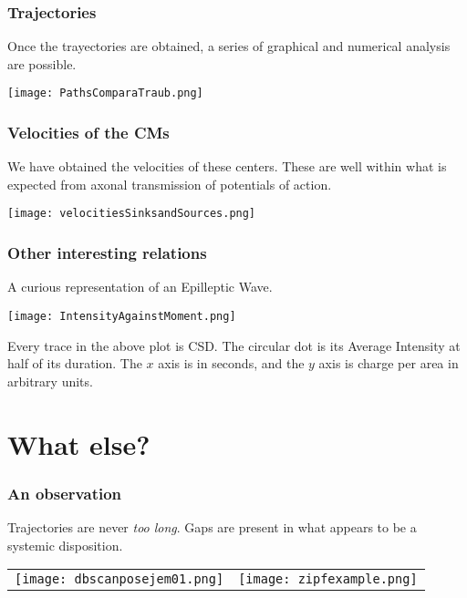 \documentclass[10pt]{beamer}
\begin{document}
\begin{frame}
  \frametitle{Trajectories}
  Once the trayectories are obtained, a series of graphical and
  numerical analysis are possible. 
  \begin{center}
    \texttt{[image: PathsComparaTraub.png]}
  \end{center}
  
\end{frame}

\begin{frame}
  \frametitle{Velocities of the CMs}
  We have obtained the velocities of these centers.
  These are well within what is expected from axonal transmission
  of potentials of action.
  \begin{center}
    \texttt{[image: velocitiesSinksandSources.png]}
  \end{center}
\end{frame}

\begin{frame}
  \frametitle{Other interesting relations}
  A curious representation of an Epilleptic Wave.
  \begin{center}
    \texttt{[image: IntensityAgainstMoment.png]}
  \end{center}
  Every trace in the above plot is  CSD. The circular dot is its Average
  Intensity at half of its duration. The $x$ axis is in seconds, and
  the $y$ axis is charge per area in arbitrary units. 
\end{frame}

\section{What else?}

\begin{frame}
  \frametitle{An observation}
  Trajectories are never \emph{too long}. Gaps are present
  in what appears to be a systemic disposition.
  \begin{center}
    \begin{tabular}{cc}
      \texttt{[image: dbscanposejem01.png]}
      &
      \texttt{[image: zipfexample.png]}
    \end{tabular}
  \end{center}
\end{frame}



\begin{frame}
  
\end{frame}
\end{document}
